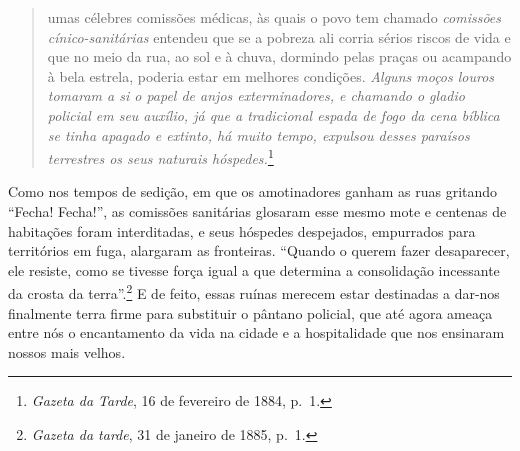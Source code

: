 \begin{quote}
umas célebres comissões médicas, às quais o povo tem chamado
\textit{comissões cínico-sanitárias} entendeu que se a pobreza ali corria
sérios riscos de vida e que no meio da rua, ao sol e à chuva, dormindo
pelas praças ou acampando à bela estrela, poderia estar em melhores
condições. \textit{Alguns moços louros tomaram a si o papel de anjos
exterminadores, e chamando o gladio policial em seu auxílio, já que a
tradicional espada de fogo da cena bíblica se tinha apagado e extinto,
há muito tempo, expulsou desses paraísos terrestres os seus naturais
hóspedes.}\footnote{\textit{Gazeta da Tarde}, 16 de fevereiro de 1884,
  p.~1.}
\end{quote}

Como nos tempos de sedição, em que os amotinadores ganham as ruas
gritando ``Fecha! Fecha!'', as comissões sanitárias glosaram esse mesmo
mote e centenas de habitações foram interditadas, e seus hóspedes
despejados, empurrados para territórios em fuga, alargaram as
fronteiras. ``Quando o querem fazer desaparecer, ele resiste, como se
tivesse força igual a que determina a consolidação incessante da crosta
da terra''.\footnote{\textit{Gazeta da tarde}, 31 de janeiro de 1885,
  p.~1.} E de feito, essas ruínas merecem estar destinadas a dar-nos
finalmente terra firme para substituir o pântano policial, que até agora
ameaça entre nós o encantamento da vida na cidade e a hospitalidade que
nos ensinaram nossos mais velhos.

